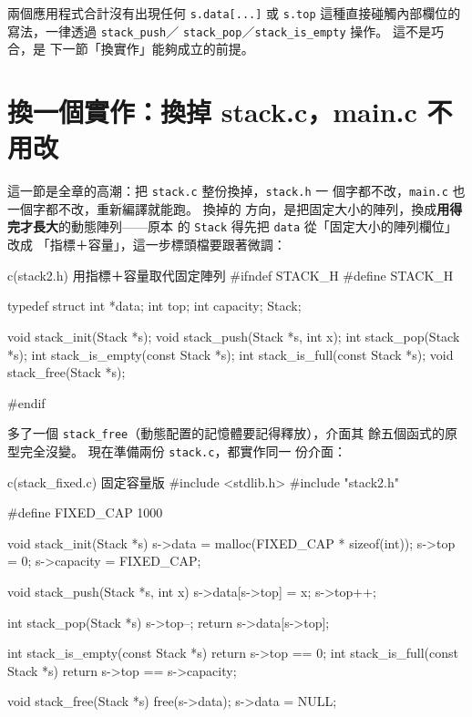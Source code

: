 
兩個應用程式合計沒有出現任何 \texttt{s.data[...]} 或 \texttt{s.top}
這種直接碰觸內部欄位的寫法，一律透過 \texttt{stack\_push}／
\texttt{stack\_pop}／\texttt{stack\_is\_empty} 操作。 這不是巧合，是
下一節「換實作」能夠成立的前提。


\section{換一個實作：換掉 stack.c，main.c 不用改}
\label{sec:obj-swap}

這一節是全章的高潮：把 \texttt{stack.c} 整份換掉，\texttt{stack.h} 一
個字都不改，\texttt{main.c} 也一個字都不改，重新編譯就能跑。 換掉的
方向，是把固定大小的陣列，換成\textbf{用得完才長大}的動態陣列——原本
的 \texttt{Stack} 得先把 \texttt{data} 從「固定大小的陣列欄位」改成
「指標＋容量」，這一步標頭檔要跟著微調：

\begin{example}{c}{(stack2.h) 用指標＋容量取代固定陣列}
#ifndef STACK_H
#define STACK_H

typedef struct {
    int *data;
    int top;
    int capacity;
} Stack;

void stack_init(Stack *s);
void stack_push(Stack *s, int x);
int  stack_pop(Stack *s);
int  stack_is_empty(const Stack *s);
int  stack_is_full(const Stack *s);
void stack_free(Stack *s);

#endif
\end{example}

多了一個 \texttt{stack\_free}（動態配置的記憶體要記得釋放），介面其
餘五個函式的原型完全沒變。 現在準備兩份 \texttt{stack.c}，都實作同一
份介面：

\begin{example}{c}{(stack\_fixed.c) 固定容量版}
#include <stdlib.h>
#include "stack2.h"

#define FIXED_CAP 1000

void stack_init(Stack *s) {
    s->data = malloc(FIXED_CAP * sizeof(int));
    s->top = 0;
    s->capacity = FIXED_CAP;
}

void stack_push(Stack *s, int x) {
    s->data[s->top] = x;
    s->top++;
}

int stack_pop(Stack *s) {
    s->top--;
    return s->data[s->top];
}

int stack_is_empty(const Stack *s) { return s->top == 0; }
int stack_is_full(const Stack *s)  { return s->top == s->capacity; }

void stack_free(Stack *s) {
    free(s->data);
    s->data = NULL;
}
\end{example}

